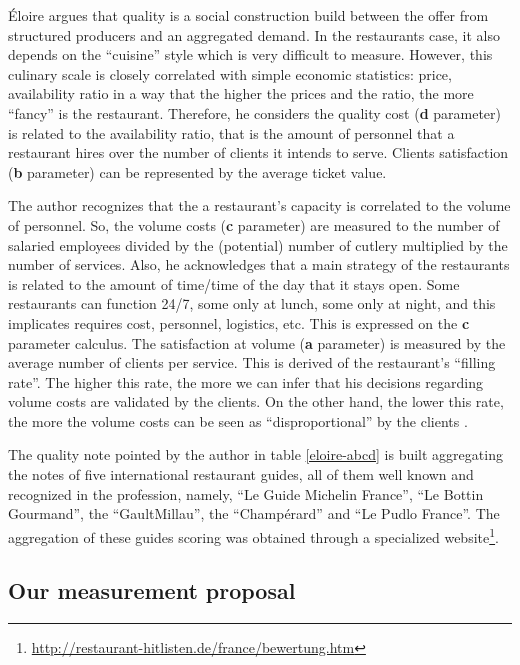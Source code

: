 \documentclass[a4paper, 12pt, openright, oneside, german, french, brazil, english]{abntex2}
\begin{document}
	Éloire argues that quality is a social construction build between the offer from structured producers and an aggregated demand. In the restaurants case, it also depends on the ``cuisine'' style which is very difficult to measure. However, this culinary scale is closely correlated with simple economic statistics: price, availability ratio in a way that the higher the prices and the ratio, the more ``fancy'' is the restaurant. Therefore, he considers the quality cost (\textbf{d} parameter) is related to the availability ratio, that is the amount of personnel that a restaurant hires over the number of clients it intends to serve. Clients satisfaction (\textbf{b} parameter) can be represented by the average ticket value.

        The author recognizes that the a restaurant's capacity is correlated to the volume of personnel. So, the volume costs (\textbf{c} parameter) are measured to the number of salaried employees divided by the (potential) number of cutlery multiplied by the number of services. Also, he acknowledges that a main strategy of the restaurants is related to the amount of time/time of the day that it stays open. Some restaurants can function 24/7, some only at lunch, some only at night,  and this implicates requires cost, personnel, logistics, etc. This is expressed on the \textbf{c} parameter calculus. The satisfaction at volume (\textbf{a} parameter) is measured by the average number of clients per service. This is derived of the restaurant's ``filling rate''. The higher this rate, the more we can infer that his decisions regarding volume costs are validated by the clients. On the other hand, the lower this rate, the more the volume costs can be seen as ``disproportional'' by the clients \cite{eloire2009reseaux}.

        The quality note pointed by the author in table \ref{eloire-abcd} is built aggregating the notes of five international restaurant guides, all of them well known and recognized in the profession, namely, ``Le Guide Michelin France'', ``Le Bottin Gourmand'', the ``GaultMillau'', the ``Champérard'' and ``Le Pudlo France''. The aggregation of these guides scoring was obtained through a specialized website\footnote{\url{http://restaurant-hitlisten.de/france/bewertung.htm}}.
        
	
	
         
        \subsection{Our measurement proposal}
\end{document}
